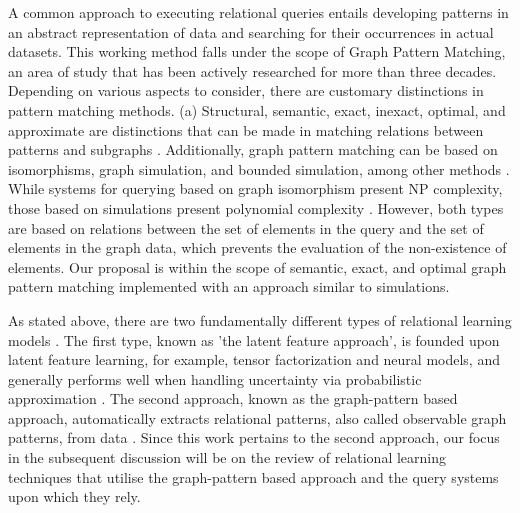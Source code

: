 \documentclass{article}%
\begin{document}
A common approach to executing relational queries entails developing patterns in an abstract representation of data and searching for their occurrences in actual datasets\nocite{phdthesis,Barcelo,gupta2015neo4j,Segaran:2009:PSW:1696488,graphlog,van2016pgql}. This working method falls under the scope of Graph Pattern Matching, an area of study that has been actively researched for more than three decades. Depending on various aspects to consider, there are customary distinctions in pattern matching methods. (a) Structural, semantic, exact, inexact, optimal, and approximate are distinctions that can be made in matching relations between patterns and subgraphs \citep{matching}. Additionally, graph pattern matching can be based on isomorphisms, graph simulation, and bounded simulation, among other methods \citep{Milner,Fan,distance-join}. While systems for querying based on graph isomorphism present NP complexity, those based on simulations present polynomial complexity \citep{henzinger1995computing,ma_2014}. However, both types are based on relations between the set of elements in the query and the set of elements in the graph data, which prevents the evaluation of the non-existence of elements. Our proposal is within the scope of semantic, exact, and optimal graph pattern matching implemented with an approach similar to simulations.

As stated above, there are two fundamentally different types of relational learning models \citep{nickel2016review}. The first type, known as 'the latent feature approach', is founded upon latent feature learning, for example, tensor factorization and neural models, and generally performs well when handling uncertainty via probabilistic approximation \citep{Jacob:2014:LLR:2556195.2556225,typed,transe}. The second approach, known as the graph-pattern based approach, automatically extracts relational patterns, also called observable graph patterns, from data \citep{Leiva02mrdtl:a,Geamsakul2003}. Since this work pertains to the second approach, our focus in the subsequent discussion will be on the review of relational learning techniques that utilise the graph-pattern based approach and the query systems upon which they rely.
\end{document}
